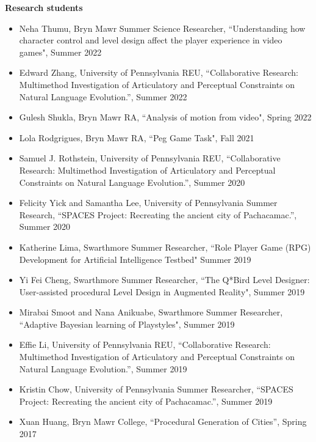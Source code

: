 {\bf Research students} 
\vspace{-1.0em}

\begin{itemize}[leftmargin=*,label={}]
\item Neha Thumu, Bryn Mawr Summer Science Researcher, ``Understanding how character control and level design affect the player experience in video games", Summer 2022
\item Edward Zhang, University of Pennsylvania REU, ``Collaborative Research: Multimethod Investigation of Articulatory and Perceptual Constraints on Natural Language Evolution.'', Summer 2022 
\item Gulesh Shukla, Bryn Mawr RA, ``Analysis of motion from video", Spring 2022
\item Lola Rodgrigues, Bryn Mawr RA, ``Peg Game Task", Fall 2021
\item Samuel J. Rothstein, University of Pennsylvania REU, ``Collaborative Research: Multimethod Investigation of Articulatory and Perceptual Constraints on Natural Language Evolution.'', Summer 2020 
\item Felicity Yick and Samantha Lee, University of Pennsylvania Summer Research, ``SPACES Project: Recreating the ancient city of Pachacamac.'', Summer 2020 
\item Katherine Lima, Swarthmore Summer Researcher, ``Role Player Game (RPG) Development for Artificial Intelligence Testbed" Summer 2019
\item Yi Fei Cheng, Swarthmore Summer Researcher, ``The Q*Bird Level Designer: User-assisted procedural Level Design in Augmented Reality", Summer 2019
\item Mirabai Smoot and Nana Anikuabe, Swarthmore Summer Researcher, ``Adaptive Bayesian learning of Playstyles", Summer 2019 
\item Effie Li, University of Pennsylvania REU, ``Collaborative Research: Multimethod Investigation of Articulatory and Perceptual Constraints on Natural Language Evolution.'', Summer 2019 
\item Kristin Chow, University of Pennsylvania Summer Researcher, ``SPACES Project: Recreating the ancient city of Pachacamac.'', Summer 2019 
\item Xuan Huang, Bryn Mawr College, ``Procedural Generation of Cities'', Spring 2017
\end{itemize}


